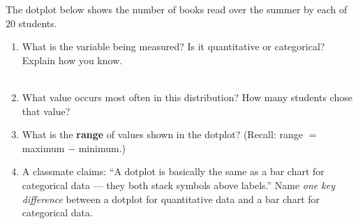 \documentclass[10pt]{article}
\begin{document}
\namedateperiod

\vspace{0.16in}

\noindent The dotplot below shows the number of books read over the summer by
each of 20 students.

\vspace{0.14in}

\begin{center}
\end{center}

\vspace{0.18in}

\begin{enumerate}[leftmargin=1.5em, itemsep=10pt]

  \item What is the variable being measured? Is it quantitative or categorical?
        Explain how you know.\\[6pt]
        \writeline\\[1pt]\writeline

  \item What value occurs most often in this distribution?
        How many students chose that value?\\[6pt]
        \writeline

  \item What is the \textbf{range} of values shown in the dotplot?
        (Recall: range $=$ maximum $-$ minimum.)\\[6pt]
        \writeline

  \item A classmate claims: ``A dotplot is basically the same as a bar chart for
        categorical data --- they both stack symbols above labels.''
        Name \textit{one key difference} between a dotplot for quantitative data
        and a bar chart for categorical data.\\[6pt]
        \writeline\\[1pt]\writeline

\end{enumerate}
\end{document}
